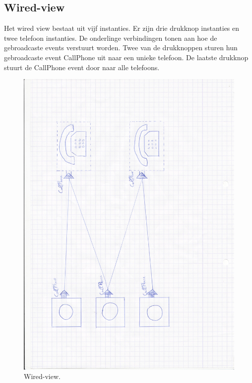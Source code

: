 \documentclass[]{article}
\begin{document}
\subsection{Wired-view}
Het wired view bestaat uit vijf instanties. Er zijn drie drukknop instanties en twee telefoon instanties. De onderlinge verbindingen tonen aan hoe de gebroadcaste events verstuurt worden. Twee van de drukknoppen sturen hun gebroadcaste event CallPhone uit naar een unieke telefoon. De laatste drukknop stuurt de CallPhone event door naar alle telefoons. 
\begin{figure}
  \centering
\includegraphics[scale=0.15]{mockups/wiredview.jpg}
  \caption{Wired-view.} \label{wire}
\end{figure}
\end{document}
